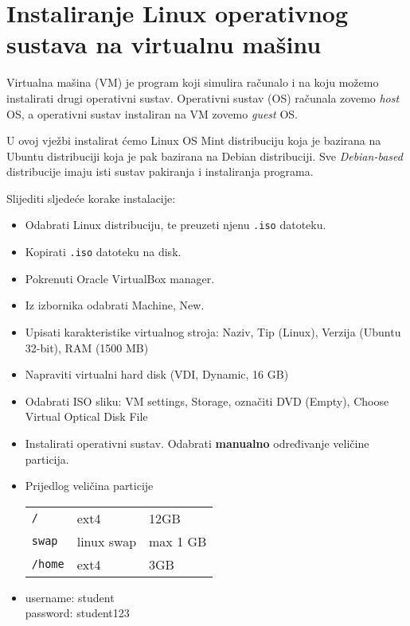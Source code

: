 

\section{Instaliranje Linux operativnog sustava na virtualnu mašinu}
Virtualna mašina (VM) je program koji simulira računalo i na koju možemo instalirati drugi operativni sustav. Operativni sustav (OS) računala zovemo \textit{host} OS, a operativni sustav instaliran na VM zovemo \textit{guest} OS.

U ovoj vježbi instalirat ćemo Linux OS Mint distribuciju koja je bazirana na Ubuntu distribuciji koja je pak bazirana na Debian distribuciji. Sve \textit{Debian-based} distribucije imaju isti sustav pakiranja i instaliranja programa.

\begin{zadatak} Slijediti sljedeće korake instalacije:
\begin{itemize}
\item Odabrati Linux distribuciju, te preuzeti njenu \texttt{.iso} datoteku.
\item Kopirati \texttt{.iso} datoteku na disk.
\item  Pokrenuti Oracle VirtualBox manager.
\item Iz izbornika odabrati Machine, New.
\item Upisati karakteristike virtualnog stroja: Naziv, Tip (Linux), Verzija (Ubuntu 32-bit), RAM (1500 MB)
\item Napraviti virtualni hard disk (VDI, Dynamic, 16 GB)
\item Odabrati ISO sliku: VM settings, Storage, označiti DVD (Empty), Choose Virtual Optical Disk File
\item Instalirati operativni sustav. Odabrati \textbf{manualno} određivanje veličine particija.
    
\item Prijedlog veličina particije 

\begin{tabular}{lll}
 \texttt{/} & ext4 & 12GB \\
 \texttt{swap} & linux swap & max 1 GB\\
 \texttt{/home} & ext4 & 3GB 
 \end{tabular}
\item username: student\\
      password: student123  
\end{itemize}
\end{zadatak}
 

